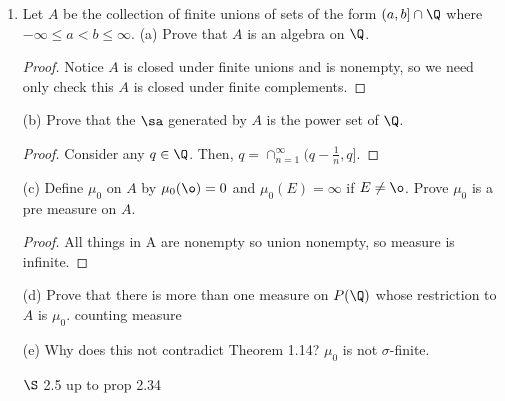 \begin{enumerate}
\item Let $A$ be the collection of finite unions of sets of the form $(a, b] \cap \Q$ where $-\infty \leq a < b \leq \infty$.
\subitem(a) Prove that $A$ is an algebra on $\Q$.
\begin{proof}
Notice $A$ is closed under finite unions and is nonempty, so we need only check this $A$ is closed under finite complements. 	
\end{proof}
\subitem(b) Prove that the $\sa$ generated by $A$ is the power set of $\Q$.
\begin{proof}
	Consider any $q \in \Q$. Then, $q = \cap_{n=1}^\infty (q - \frac{1}{n}, q]$.
\end{proof}
 \subitem(c) Define $\mu_0$ on $A$ by $\mu_0(\o)=0$ and $\mu_0(E)= \infty$ if $E \neq \o$. Prove $\mu_0$ is a pre measure on $A$. 	
 \begin{proof}
 All things in A are nonempty so union nonempty, so measure is infinite. 	
 \end{proof}

 \subitem(d) Prove that there is more than one measure on $P(\Q)$ whose restriction to $A$ is $\mu_0$.
 counting measure
 
 \subitem(e) Why does this not contradict Theorem 1.14?
 $\mu_0$ is not $\sigma$-finite. 
 
 $\S$ 2.5 up to prop 2.34
\end{enumerate}
